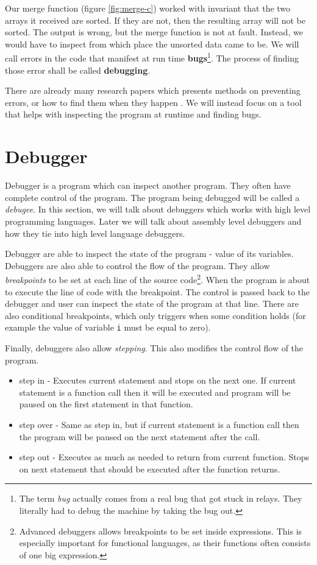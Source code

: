 Our merge function (figure \ref{fig:merge-c}) worked with invariant that the two arrays it received are sorted.
If they are not, then the resulting array will not be sorted. The output is wrong, but the merge function is not
at fault. Instead, we would have to inspect from which place the unsorted data came to be. We will call
errors in the code that manifest at run time \textbf{bugs}\footnote{The term \textit{bug} actually comes from a real bug that got stuck in relays.
They literally had to debug the machine by taking the bug out.}. The process of finding those error shall be
called \textbf{debugging}.

There are already many research papers which presents methods on preventing errors, or how to find them when they 
happen \cite{software-debugging-testing-verification, Debugging-difference-between-expert-and-novice, zeller2009programs, debugging-inputs}.
We will instead focus on a tool that helps with inspecting the program at runtime and finding bugs.

\section{Debugger}
Debugger is a program which can inspect another program. They often have complete control of the program.
The program being debugged will be called a \textit{debugee}. In this section, we will talk about debuggers
which works with high level programming languages. Later we will talk about assembly level debuggers and
how they tie into high level language debuggers.

Debugger are able to inspect the state of the program - value of its variables. Debuggers are also able to control
the flow of the program. They allow \textit{breakpoints} to be set at each line of the source code\footnote{Advanced debuggers allows breakpoints to be set inside expressions.
This is especially important for functional languages, as their functions often consists of one big expression.}.
When the program is about to execute the line of code with the breakpoint. The control is passed back to the
debugger and user can inspect the state of the program at that line. There are also conditional breakpoints,
which only triggers when some condition holds (for example the value of variable \texttt{i} must be equal to zero).

Finally, debuggers also allow \textit{stepping}. This also modifies the control flow of the program.
\begin{itemize}
    \item step in - Executes current statement and stops on the next one. If current statement is a function call then
                    it will be executed and program will be paused on the first statement in that function.
    \item step over - Same as step in, but if current statement is a function call then the program will
                      be paused on the next statement after the call.
    \item step out -  Executes as much as needed to return from current function. Stops on next statement that
                      should be executed after the function returns.
\end{itemize}

